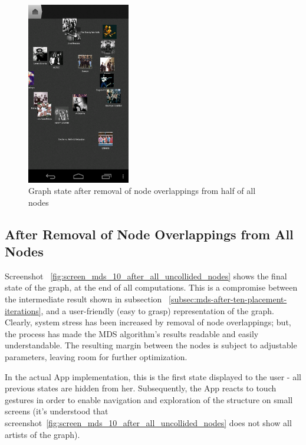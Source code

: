 \begin{figure}[H]
  \centering
    \includegraphics[width=0.4\textwidth]{figures/screen_mds_9_after_half_uncollided_nodes}
  \caption{Graph state after removal of node overlappings from half of all nodes}
  \label{fig:screen_mds_9_after_half_uncollided_nodes}
\end{figure}

\newpage
\subsection{After Removal of Node Overlappings from All Nodes}

Screenshot ~\ref{fig:screen_mds_10_after_all_uncollided_nodes} shows the final state of the graph, at the end of all computations. This is a compromise between the intermediate result shown in subsection ~\ref{subsec:mds-after-ten-placement-iterations}, and a user-friendly (easy to grasp) representation of the graph. Clearly, system stress has been increased by removal of node overlappings; but, the process has made the MDS algorithm's results readable and easily understandable. The resulting margin between the nodes is subject to adjustable parameters, leaving room for further optimization.

In the actual App implementation, this is the first state displayed to the user - all previous states are hidden from her. Subsequently, the App reacts to touch gestures in order to enable navigation and exploration of the structure on small screens (it's understood that screenshot~\ref{fig:screen_mds_10_after_all_uncollided_nodes} does not show all artists of the graph).

